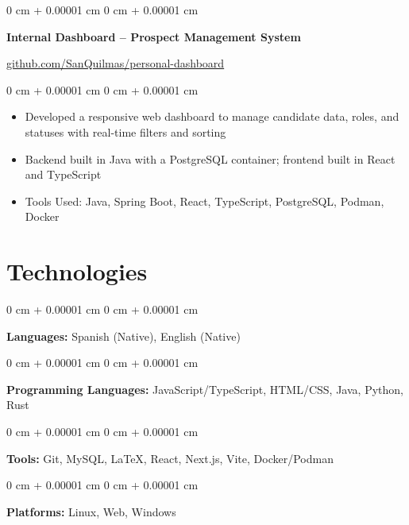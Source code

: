 \documentclass[10pt, letterpaper]{article}
\newenvironment{highlights}{
  \begin{itemize}[
        topsep=0.10 cm,
        parsep=0.10 cm,
        partopsep=0pt,
        itemsep=0pt,
        leftmargin=0 cm + 10pt
      ]
    }{
  \end{itemize}
} %
\newenvironment{onecolentry}{
  \begin{adjustwidth}{
      0 cm + 0.00001 cm
    }{
      0 cm + 0.00001 cm
    }
  }{
  \end{adjustwidth}
} %
\begin{document}
\vspace{0.2 cm}
\begin{onecolentry}
    \textbf{Internal Dashboard – Prospect Management System}
\end{onecolentry}
\vspace{0.05 cm}
\href{https://github.com/SanQuilmas/personal-dashboard}{github.com/SanQuilmas/personal-dashboard}
\vspace{0.10 cm}
\begin{onecolentry}
    \begin{highlights}
        \item Developed a responsive web dashboard to manage candidate data, roles, and statuses with real-time filters and sorting
        \item Backend built in Java with a PostgreSQL container; frontend built in React and TypeScript
        \item Tools Used: Java, Spring Boot, React, TypeScript, PostgreSQL, Podman, Docker
    \end{highlights}
\end{onecolentry}

\section{Technologies}
\begin{onecolentry}
    \textbf{Languages:} Spanish (Native), English (Native)
\end{onecolentry}
\vspace{0.2 cm}
\begin{onecolentry}
    \textbf{Programming Languages:} JavaScript/TypeScript, HTML/CSS, Java, Python, Rust
\end{onecolentry}
\vspace{0.2 cm}
\begin{onecolentry}
    \textbf{Tools:} Git, MySQL, LaTeX, React, Next.js, Vite, Docker/Podman
\end{onecolentry}
\vspace{0.2 cm}
\begin{onecolentry}
    \textbf{Platforms:} Linux, Web, Windows
\end{onecolentry}
\end{document}

